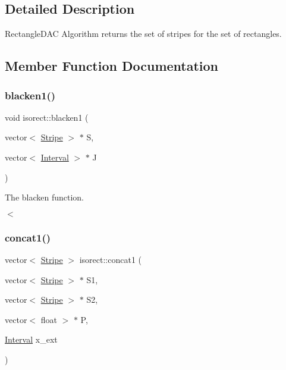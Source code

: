 \subsection{Detailed Description}
Rectangle\+D\+AC Algorithm returns the set of stripes for the set of rectangles. 

\subsection{Member Function Documentation}
\mbox{\label{classisorect_a689175a85dd1c937a2049498db80a88f}} 
\subsubsection{\texorpdfstring{blacken1()}{blacken1()}}
{\footnotesize\ttfamily void isorect\+::blacken1 (\begin{DoxyParamCaption}\item[{vector$<$ \hyperlink{classStripe}{Stripe} $>$ $\ast$}]{S,  }\item[{vector$<$ \hyperlink{classInterval}{Interval} $>$ $\ast$}]{J }\end{DoxyParamCaption})}



The blacken function. 

$<$ \mbox{\label{classisorect_aae8881a204dd1aac8bcfa00d95a7a7f0}} 
\subsubsection{\texorpdfstring{concat1()}{concat1()}}
{\footnotesize\ttfamily vector$<$ \hyperlink{classStripe}{Stripe} $>$ isorect\+::concat1 (\begin{DoxyParamCaption}\item[{vector$<$ \hyperlink{classStripe}{Stripe} $>$ $\ast$}]{S1,  }\item[{vector$<$ \hyperlink{classStripe}{Stripe} $>$ $\ast$}]{S2,  }\item[{vector$<$ float $>$ $\ast$}]{P,  }\item[{\hyperlink{classInterval}{Interval}}]{x\+\_\+ext }\end{DoxyParamCaption})}



